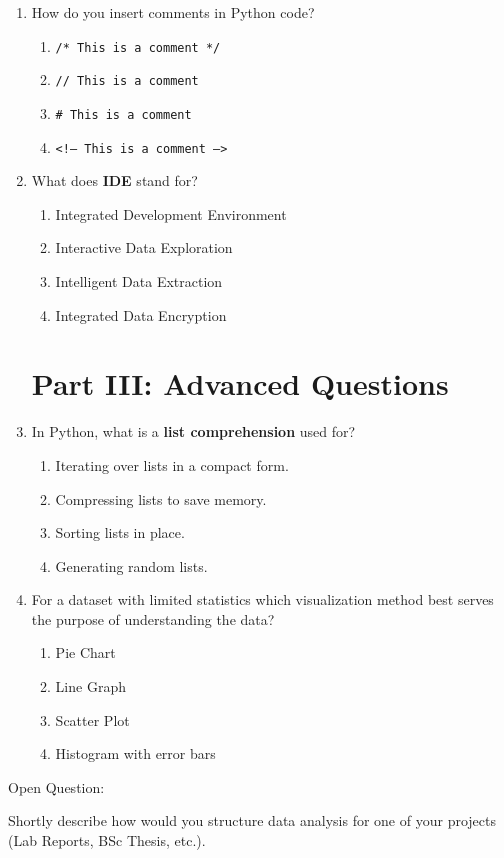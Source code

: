 \documentclass[twocolumn]{article}
\begin{document}
\begin{enumerate}
\item How do you insert comments in Python code?
\begin{enumerate}
    \item \texttt{/* This is a comment */}
    \item \texttt{// This is a comment}
    \item \texttt{\# This is a comment}
    \item \texttt{<!-- This is a comment -->}
\end{enumerate}

\item What does \textbf{IDE} stand for? 
\begin{enumerate}
    \item Integrated Development Environment
    \item Interactive Data Exploration
    \item Intelligent Data Extraction
    \item Integrated Data Encryption
\end{enumerate}

\section*{Part III: Advanced Questions}

\item In Python, what is a \textbf{list comprehension} used for?
\begin{enumerate}
    \item Iterating over lists in a compact form.
    \item Compressing lists to save memory.
    \item Sorting lists in place.
    \item Generating random lists.
\end{enumerate}

\item For a dataset with limited statistics which visualization method best
serves the purpose of understanding the data?
\begin{enumerate}
    \item Pie Chart 
    \item Line Graph 
    \item Scatter Plot 
    \item Histogram with error bars
\end{enumerate}

\end{enumerate}

Open Question: 

Shortly describe how would you structure data analysis for one of
your projects (Lab Reports, BSc Thesis, etc.).
\end{document}
